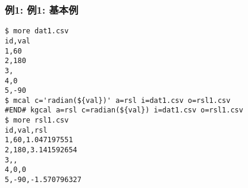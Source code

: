 \subsubsection*{例1: 例1: 基本例}



\begin{Verbatim}[baselinestretch=0.7,frame=single]
$ more dat1.csv
id,val
1,60
2,180
3,
4,0
5,-90
$ mcal c='radian(${val})' a=rsl i=dat1.csv o=rsl1.csv
#END# kgcal a=rsl c=radian(${val}) i=dat1.csv o=rsl1.csv
$ more rsl1.csv
id,val,rsl
1,60,1.047197551
2,180,3.141592654
3,,
4,0,0
5,-90,-1.570796327
\end{Verbatim}
